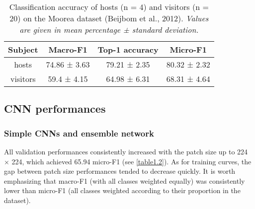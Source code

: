 \begin{table}[htbp]
  \centering
  \normalsize
  \caption[Classification accuracy of hosts (n = 4) and visitors (n = 20) on the Moorea dataset]{Classification accuracy of hosts (n = 4) and visitors (n = 20) on the Moorea dataset (Beijbom et al., 2012). \textit{Values are given in mean percentage ± standard deviation.}}
  \label{table1.1}
    \begin{tabular}{*{4}{c}}
        \toprule
        \textbf{Subject} & \textbf{Macro-F1} & \textbf{Top-1 accuracy} & \textbf{Micro-F1} \\ \midrule
        hosts            & 74.86 ± 3.63      & 79.21 ± 2.35            & 80.32 ± 2.32      \\
        visitors         & 59.4 ± 4.15       & 64.98 ± 6.31            & 68.31 ± 4.64      \\ \bottomrule
    \end{tabular}
\end{table}

\subsection{CNN performances}\label{chapitre1_6.2}

\subsubsection{Simple CNNs and ensemble network}\label{chapitre1_6.2.1}
All validation performances consistently increased with the patch size up to 224 × 224, which achieved 65.94 micro-F1 (see \autoref{table1.2}). As for training curves, the gap between patch size performances tended to decrease quickly. It is worth emphasizing that macro-F1 (with all classes weighted equally) was consistently lower than micro-F1 (all classes weighted according to their proportion in the dataset).

